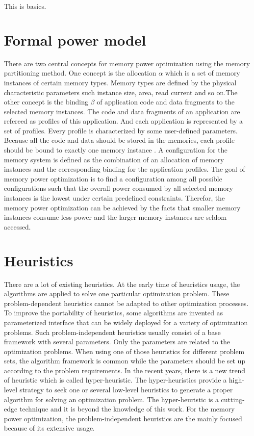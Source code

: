 \label{chap:basics}
This is basics.
	\section{Formal power model}
	There are two central concepts for memory power optimization using the memory partitioning method.
	One concept is the allocation $ \alpha $ which is a set of memory instances of certain memory types. Memory
	types are defined by the physical characteristic parameters such instance size, area, read current
	and so on.The other concept is the binding $ \beta $ of application code and data fragments to the 
	selected memory instances. The code and data fragments of an application are refereed as profiles
	of this application. And each application is represented by a set of profiles. Every profile is
	characterized by some user-defined parameters. Because all the code and data should be stored in
	the memories, each profile should be bound to exactly one memory instance \cite{Strobel2016}. 
	A configuration for the memory system is defined as the combination of an allocation of memory 
	instances and the corresponding binding for the application profiles. The goal of memory power 
	optimization is to find a configuration among all possible configurations such that the overall 
	power consumed by all selected memory instances is the lowest under certain predefined constraints.
	Therefor, the memory power optimization can be achieved by the facts 
	that smaller memory instances consume less power and the larger memory instances are 
	seldom accessed.
	\label{sec:power_model}
	
	\section{Heuristics}
	\label{sec:heuristics}
	There are a lot of existing heuristics. At the early time of heuristics usage, the algorithms are applied to solve one
	particular optimization problem. These problem-dependent heuristics cannot be adapted to other optimization processes.
	To improve the portability of heuristics, some algorithms are invented as parameterized interface that can be widely
	deployed for a variety of optimization problems. Such problem-independent heuristics usually consist of a base framework
	with several parameters. Only the parameters are related to the optimization problems. When using one of those
	heuristics for different problem sets, the algorithm framework is common while the parameters should be set up according
	to the problem requirements. In the recent years, there is a new trend of heuristic which is called hyper-heuristic.
	The hyper-heuristics provide a high-level strategy to seek one or several low-level heuristics to generate a proper algorithm for solving an optimization problem. The hyper-heuristic is a cutting-edge technique and it is beyond the knowledge of this work. For the memory power optimization, the problem-independent heuristics are the mainly focused
	because of its extensive usage.
	
